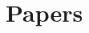 \documentclass[11pt]{amsart}
\newcommand{\blankline}{\quad\vspace{-6pt}\pagebreak[2]}
\newcommand{\rightloc}[1]{\hfill {\raggedright #1}}
\newcommand{\rightdate}[1]{\hfill {\raggedright #1}}
\newcommand{\p}[1]{{\bfseries #1}}
\begin{document}






\section*{Papers}
\end{document}
